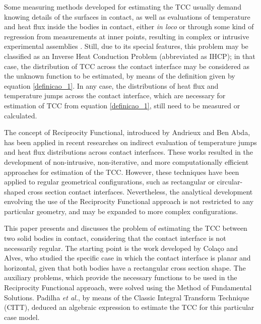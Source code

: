 \documentclass[conference,compsoc,fleqn]{IEEEtran}
\begin{document}
Some measuring methods developed for estimating the TCC usually demand knowing details of the surfaces in contact, as well as evaluations of temperature and heat flux inside the bodies in contact, either \textit{in loco} or through some kind of regression from measurements at inner points, resulting in complex or intrusive experimental assemblies \cite{artigo_fenech, tese_mikic, artigo_beck, artigo_salgon}. Still, due to its special features, this problem may be classified as an Inverse Heat Conduction Problem (abbreviated as IHCP); in that case, the distribution of TCC across the contact interface may be considered as the unknown function to be estimated, by means of the definition given by equation \eqref{definicao_1}. In any case, the distributions of heat flux and temperature jumps across the contact interface, which are necessary for estimation of TCC from equation \eqref{definicao_1}, still need to be measured or calculated.

The concept of Reciprocity Functional, introduced by Andrieux and Ben Abda\cite{artigo_andrieux}, has been applied in recent researches on indirect evaluation of temperature jumps and heat flux distributions across contact interfaces\cite{reciproc_3, artigo_colaco_2, artigo_colaco_3, artigo_abreu_2,artigo_abreu_3, artigo_padilha_2}. These works resulted in the development of non-intrusive, non-iterative, and more computationally efficient approaches for estimation of the TCC. However, these techniques have been applied to regular geometrical configurations, such as rectangular or circular-shaped cross section contact interfaces. Nevertheless, the analytical development envolving the use of the Reciprocity Functional approach is not restricted to any particular geometry, and may be expanded to more complex configurations.

This paper presents and discusses the problem of estimating the TCC between two solid bodies in contact, considering that the contact interface is not necessarily regular. The starting point is the work developed by Colaço and Alves\cite{reciproc_3}, who studied the specific case in which the contact interface is planar and horizontal, given that both bodies have a rectangular cross section shape. The auxiliary problems, which provide the necessary functions to be used in the Reciprocity Functional approach, were solved using the Method of Fundamental Solutions. Padilha \textit{et al.}\cite{artigo_padilha_3}, by means of the Classic Integral Transform Technique (CITT)\cite{livro_integral_transforms_cotta}, deduced an algebraic expression to estimate the TCC for this particular case model.
\end{document}
